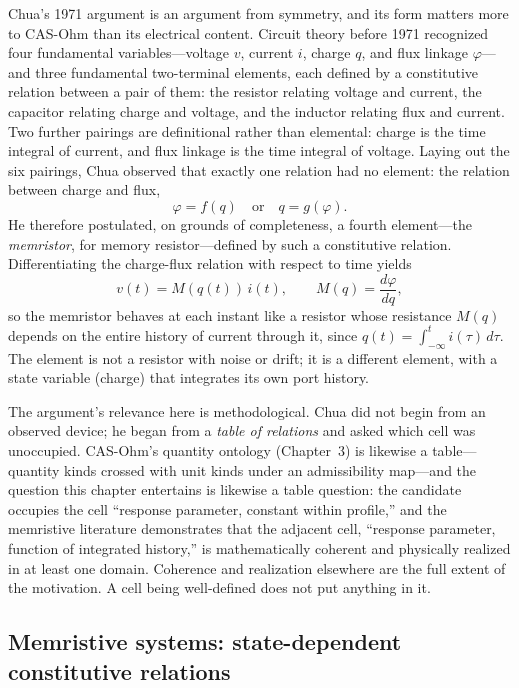 Chua's 1971 argument \cite{chua71} is an argument from symmetry, and its form matters more to CAS-Ohm than its electrical content. Circuit theory before 1971 recognized four fundamental variables---voltage $v$, current $i$, charge $q$, and flux linkage $\varphi$---and three fundamental two-terminal elements, each defined by a constitutive relation between a pair of them: the resistor relating voltage and current, the capacitor relating charge and voltage, and the inductor relating flux and current. Two further pairings are definitional rather than elemental: charge is the time integral of current, and flux linkage is the time integral of voltage. Laying out the six pairings, Chua observed that exactly one relation had no element: the relation between charge and flux,
\[
\varphi = f(q) \quad \text{or} \quad q = g(\varphi).
\]
He therefore postulated, on grounds of completeness, a fourth element---the \emph{memristor}, for memory resistor---defined by such a constitutive relation. Differentiating the charge-flux relation with respect to time yields
\[
v(t) = M(q(t))\, i(t), \qquad M(q) = \frac{d\varphi}{dq},
\]
so the memristor behaves at each instant like a resistor whose resistance $M(q)$ depends on the entire history of current through it, since $q(t)=\int_{-\infty}^{t} i(\tau)\,d\tau$. The element is not a resistor with noise or drift; it is a different element, with a state variable (charge) that integrates its own port history.

The argument's relevance here is methodological. Chua did not begin from an observed device; he began from a \emph{table of relations} and asked which cell was unoccupied. CAS-Ohm's quantity ontology (Chapter~3) is likewise a table---quantity kinds crossed with unit kinds under an admissibility map---and the question this chapter entertains is likewise a table question: the candidate occupies the cell ``response parameter, constant within profile,'' and the memristive literature demonstrates that the adjacent cell, ``response parameter, function of integrated history,'' is mathematically coherent and physically realized in at least one domain. Coherence and realization elsewhere are the full extent of the motivation. A cell being well-defined does not put anything in it.

\subsection{Memristive systems: state-dependent constitutive relations}\label{mem:sec:systems}

